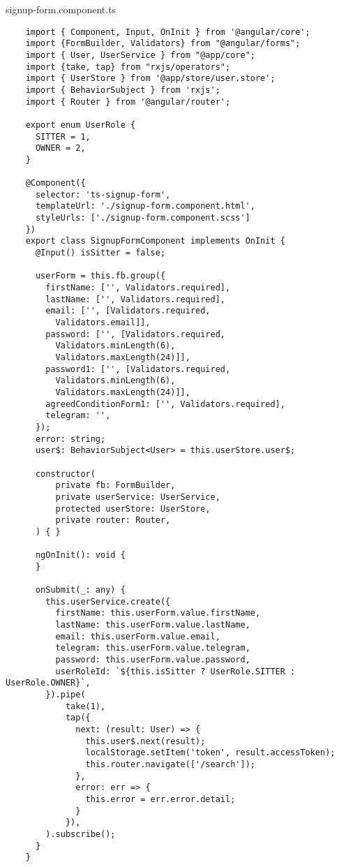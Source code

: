 signup-form.component.ts
\lstset{style=ts}
\begin{lstlisting}
    import { Component, Input, OnInit } from '@angular/core';
    import {FormBuilder, Validators} from "@angular/forms";
    import { User, UserService } from "@app/core";
    import {take, tap} from "rxjs/operators";
    import { UserStore } from '@app/store/user.store';
    import { BehaviorSubject } from 'rxjs';
    import { Router } from '@angular/router';
    
    export enum UserRole {
      SITTER = 1,
      OWNER = 2,
    }
    
    @Component({
      selector: 'ts-signup-form',
      templateUrl: './signup-form.component.html',
      styleUrls: ['./signup-form.component.scss']
    })
    export class SignupFormComponent implements OnInit {
      @Input() isSitter = false;
    
      userForm = this.fb.group({
        firstName: ['', Validators.required],
        lastName: ['', Validators.required],
        email: ['', [Validators.required,
          Validators.email]],
        password: ['', [Validators.required,
          Validators.minLength(6),
          Validators.maxLength(24)]],
        password1: ['', [Validators.required,
          Validators.minLength(6),
          Validators.maxLength(24)]],
        agreedConditionForm1: ['', Validators.required],
        telegram: '',
      });
      error: string;
      user$: BehaviorSubject<User> = this.userStore.user$;
    
      constructor(
          private fb: FormBuilder,
          private userService: UserService,
          protected userStore: UserStore,
          private router: Router,
      ) { }
    
      ngOnInit(): void {
      }
    
      onSubmit(_: any) {
        this.userService.create({
          firstName: this.userForm.value.firstName,
          lastName: this.userForm.value.lastName,
          email: this.userForm.value.email,
          telegram: this.userForm.value.telegram,
          password: this.userForm.value.password,
          userRoleId: `${this.isSitter ? UserRole.SITTER : UserRole.OWNER}`,
        }).pipe(
            take(1),
            tap({
              next: (result: User) => {
                this.user$.next(result);
                localStorage.setItem('token', result.accessToken);
                this.router.navigate(['/search']);
              },
              error: err => {
                this.error = err.error.detail;
              }
            }),
        ).subscribe();
      }
    }    
\end{lstlisting}

